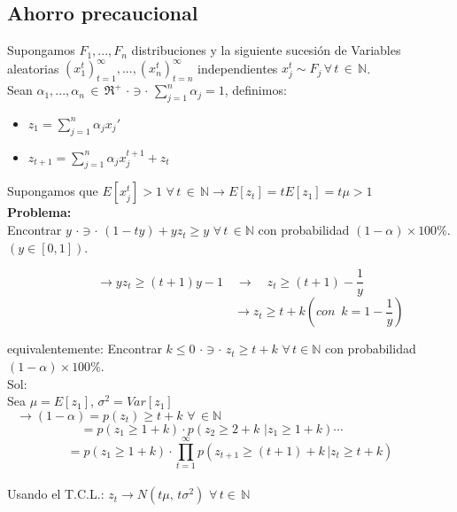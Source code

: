  \subsection{Ahorro precaucional}
\label{sec:ahorro-precaucional}
 Supongamos $F_1,...,F_n$ distribuciones y la siguiente sucesión de Variables aleatorias $(x_1^t)_{t=1}^{\infty},..., (x_n^t)_{t=n}^{\infty}$ independientes $x_j^{t} \sim F_j \,\forall\, t\, \in\, \mathbb{N}$.\\

 Sean $\alpha_1,..., \alpha_n\,\in\,\Re^+\,\, \cdot \ni \cdot \,\,\displaystyle \sum_{j=1}^n\alpha_j=1$, definimos:

 \begin{itemize}
  \item $z_1=\displaystyle \sum_{j=1}^n\alpha_jx_j'$
  \item $z_{t+1}=\displaystyle \sum_{j=1}^n\alpha_jx_j^{t+1}+z_t$
 \end{itemize}
 Supongamos que $E[x_j^t]>1\,\,\forall\,t \,\in\,\mathbb{N}\rightarrow E[z_t]=tE[z_1]=t\mu>1$\\

 {\bf Problema:}\\
 Encontrar $y \,\,\cdot \ni\cdot\,\,(1-ty)+yz_t \ge y\,\,\forall\,t\,\in \mathbb{N}$ con probabilidad $(1-\alpha)\times 100\%$. $(y\in[0,1])$.

 $$\rightarrow y z_t\ge (t+1)y-1\quad\rightarrow\quad z_t\ge(t+1)-\frac{1}{y}$$
 $$\qquad\qquad\qquad\qquad\qquad\qquad\qquad\,\,\rightarrow z_t\ge t+k (con\,\,\,k=1-\frac{1}{y})$$

 equivalentemente: Encontrar $k\le 0\,\,\cdot\ni\cdot\,\,z_t\ge t+k\,\,\forall\,t\in\mathbb{N}$ con probabilidad $(1-\alpha)\times 100\%$.\\

 Sol: \\
 Sea $\mu=E[z_1]$, $\sigma^2=Var[z_1]$\\

 \[\rightarrow (1-\alpha)=p(z_t)\ge t+k\,\,\forall\,\in\mathbb{N}\qquad\qquad\qquad\qquad\qquad\qquad\qquad\qquad\quad\quad\]
 \[=p(z_1\ge 1+k)\cdot p(z_2\ge 2+k\,\,|z_1\ge 1+k)\cdots\qquad\quad\]
 \[=p(z_1\ge 1+k)\cdot\displaystyle\prod_{t=1}^{\infty}p(z_{t+1}\ge (t+1)+k\,|z_t\ge t+k)\]\\

 Usando el T.C.L.: $z_t \rightarrow N(t\mu,\,t\sigma^2)\,\,\forall\,t\in\,\mathbb{N}$

